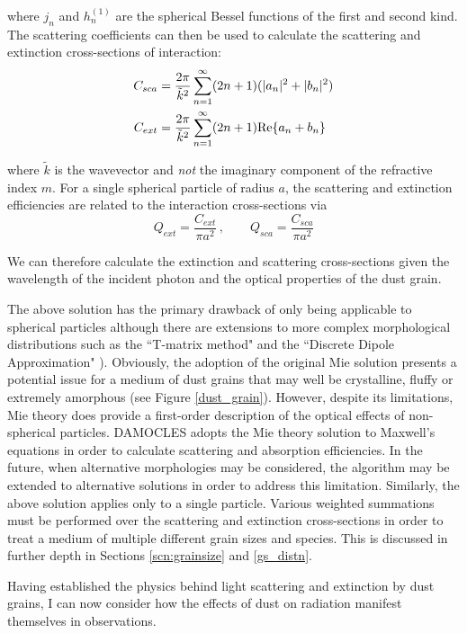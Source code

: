 \noindent where $j_n$ and $h_n^{(1)}$ are the spherical Bessel functions of the first and second kind.  The scattering coefficients can then be used to calculate the scattering and extinction cross-sections of interaction:
\begin{align}
C_{sca}&=\frac{2\pi}{\tilde{k}^2}\sum_{n=1}^{\infty} (2n+1)(|a_n|^2+|b_n|^2) \\
C_{ext}&=\frac{2\pi}{\tilde{k}^2}\sum_{n=1}^{\infty} (2n+1)\textnormal{Re}\{a_n+b_n\} 
\end{align}

\noindent where $\tilde{k}$ is the wavevector and {\em not} the imaginary component of the refractive index $m$.  For a single spherical particle of radius $a$, the scattering and extinction efficiencies are related to the interaction cross-sections via
\begin{equation}
Q_{ext}=\frac{C_{ext}}{\pi a^2}\, , \quad \quad Q_{sca}=\frac{C_{sca}}{\pi a^2}
\end{equation}

\noindent We can therefore calculate the extinction and scattering cross-sections given the wavelength of the incident photon and the optical properties of the dust grain.  



The above solution has the primary drawback of only being applicable to spherical particles although there are extensions to more complex morphological distributions such as the ``T-matrix method" and the ``Discrete Dipole Approximation" \citep{Mishchenko2002,Draine2004}). Obviously, the adoption of the original Mie solution presents a potential issue for a medium of dust grains that may well be crystalline, fluffy or extremely amorphous (see Figure \ref{dust_grain}).  However, despite its limitations, Mie theory does provide a first-order description of the optical effects of non-spherical particles.  DAMOCLES adopts the Mie theory solution to Maxwell's equations in order to calculate scattering and absorption efficiencies.  In the future, when alternative morphologies may be considered, the algorithm may be extended to alternative solutions  in order to address this limitation.  Similarly, the above solution applies only to a single particle.  Various weighted summations must be performed over the scattering and extinction cross-sections in order to treat a medium of multiple different grain sizes and species.  This is discussed in further depth in Sections \ref{scn:grainsize} and \ref{gs_distn}.

Having established the physics behind light scattering and extinction by dust grains, I can now consider how the effects of dust on radiation manifest themselves in observations. 

